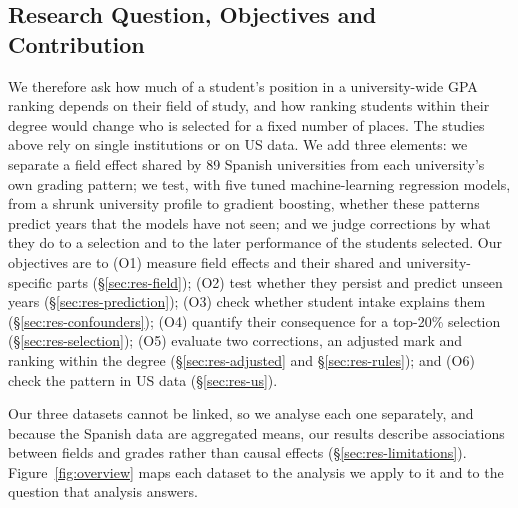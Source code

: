 
\subsection{Research Question, Objectives and Contribution}
\label{sec:objectives}

We therefore ask how much of a student's position in a university-wide GPA ranking depends on their field of study, and how ranking students within their degree would change who is selected for a fixed number of places. The studies above rely on single institutions or on US data. We add three elements: we separate a field effect shared by 89 Spanish universities from each university's own grading pattern; we test, with five tuned machine-learning regression models, from a shrunk university profile to gradient boosting, whether these patterns predict years that the models have not seen; and we judge corrections by what they do to a selection and to the later performance of the students selected. Our objectives are to (O1) measure field effects and their shared and university-specific parts (\S\ref{sec:res-field}); (O2) test whether they persist and predict unseen years (\S\ref{sec:res-prediction}); (O3) check whether student intake explains them (\S\ref{sec:res-confounders}); (O4) quantify their consequence for a top-20\% selection (\S\ref{sec:res-selection}); (O5) evaluate two corrections, an adjusted mark and ranking within the degree (\S\ref{sec:res-adjusted} and \S\ref{sec:res-rules}); and (O6) check the pattern in US data (\S\ref{sec:res-us}).

Our three datasets cannot be linked, so we analyse each one separately, and because the Spanish data are aggregated means, our results describe associations between fields and grades rather than causal effects (\S\ref{sec:res-limitations}). Figure~\ref{fig:overview} maps each dataset to the analysis we apply to it and to the question that analysis answers.
